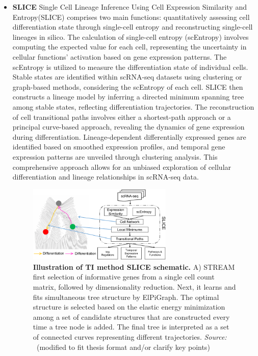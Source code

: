 \begin{itemize}
    \item \textbf{SLICE}
    Single Cell Lineage Inference Using Cell Expression Similarity and Entropy(SLICE)\citep{guo2017slice} comprises two main functions: quantitatively assessing cell differentiation state through single-cell entropy and reconstructing single-cell lineages in silico. The calculation of single-cell entropy (scEntropy) involves computing the expected value for each cell, representing the uncertainty in cellular functions' activation based on gene expression patterns. The scEntropy is utilized to measure the differentiation state of individual cells. Stable states are identified within scRNA-seq datasets using clustering or graph-based methods, considering the scEntropy of each cell. SLICE then constructs a lineage model by inferring a directed minimum spanning tree among stable states, reflecting differentiation trajectories. The reconstruction of cell transitional paths involves either a shortest-path approach or a principal curve-based approach, revealing the dynamics of gene expression during differentiation. Lineage-dependent differentially expressed genes are identified based on smoothed expression profiles, and temporal gene expression patterns are unveiled through clustering analysis. This comprehensive approach allows for an unbiased exploration of cellular differentiation and lineage relationships in scRNA-seq data.
    \begin{figure}[ht!]
    	\centering
    	\includegraphics[width=0.65\textwidth]{TI_Alg_SLICE/fig}
    	\vspace{0.1cm}
    	\caption[Illustration of TI method SLICE schematic.]{\textbf{Illustration of TI method SLICE schematic.} 
    	A)  STREAM first selection of informative genes from a single cell count matrix, followed by dimensionality reduction. Next, it learns and fits simultaneous tree structure by ElPiGraph. The optimal structure is selected based on the elastic energy minimization among a set of candidate structures that are constructed every time a tree node is added. The final tree is interpreted as a set of connected curves representing different trajectories. \emph{Source: ~\cite{guo2017slice}}(modified to fit thesis format and/or clarify key points)
    	}
    	\label{fig:TI_Alg_SLICE}
    \end{figure}


\end{itemize}
